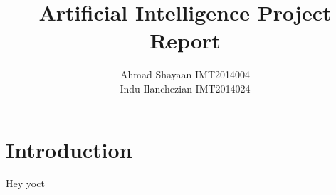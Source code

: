 \documentclass{article}
\title{Artificial Intelligence  Project Report}
\author{Ahmad Shayaan IMT2014004 \\ Indu Ilanchezian IMT2014024}
\begin{document}
	\maketitle
	
	\section{Introduction}
	Hey yoct
\end{document}
